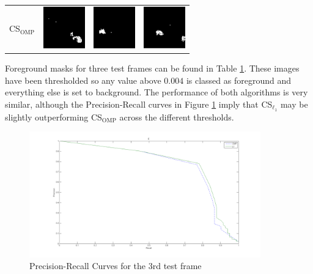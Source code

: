 \documentclass[conference]{IEEEtran}
\begin{document}
\begin{table}[ht!]
\begin{tabular}{cccc}
\parbox[top]{18mm}{CS$_{\text{OMP}}$} & \includegraphics[width=18mm]{1o}& \includegraphics[width=18mm]{2o} & \includegraphics[width=18mm]{3o} \\
\end{tabular}
\label{tab:gt}
\end{table}


Foreground masks for three test frames can be found in Table \ref{tab:gt}. These images have been thresholded so any value above $0.004$ is classed as foreground and everything else is set to background. The performance of both algorithms is very similar, although the Precision-Recall curves in Figure \ref{fig:precrec} imply that CS$_{\ell_1}$ may be slightly outperforming CS$_{\text{OMP}}$ across the different thresholds. 

\begin{figure}[t]
  \centering
  \includegraphics[width = 10cm]{Epr}
  \caption{Precision-Recall Curves for the 3rd test frame}
  \label{fig:precrec}
\end{figure}
\end{document}
